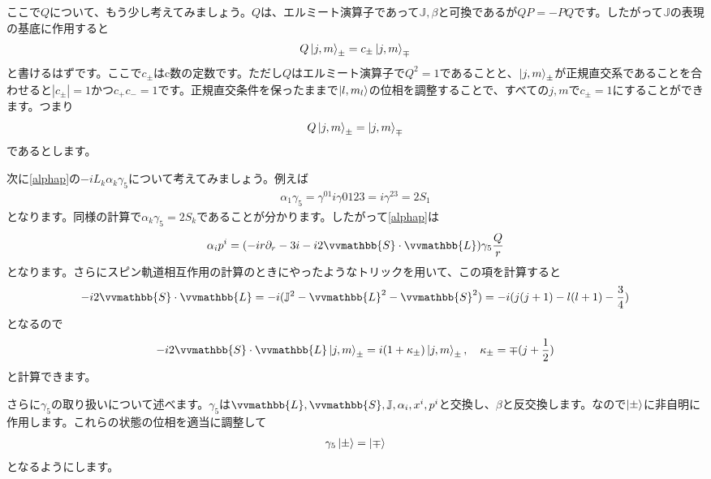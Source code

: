 \documentclass[report,paper=a4, fontsize=12pt, line_length=16cm, number_of_lines=33,dvipdfmx]{jlreq}
\numberwithin{equation}{chapter}
\newcommand{\del}{\partial}
\newcommand{\Lb}{\vvmathbb{L}}
\newcommand{\Sb}{\vvmathbb{S}}
\newcommand{\Jb}{\mathbb{J}}
\newcommand{\ml}{m_{l}}
\begin{document}
ここで$Q$について、もう少し考えてみましょう。$Q$は、エルミート演算子であって$\Jb,\beta$と可換であるが$QP=-PQ$です。したがって$\Jb$の表現の基底に作用すると
\begin{align*}
  Q\ket{j,m}_{\pm}=c_{\pm}\ket{j,m}_{\mp}
\end{align*}
と書けるはずです。ここで$c_{\pm}$はc数の定数です。ただし$Q$はエルミート演算子で$Q^2=1$であることと、$\ket{j,m}_{\pm}$が正規直交系であることを合わせると$|c_{\pm}|=1$かつ$c_{+}c_{-}=1$です。正規直交条件を保ったままで$\ket{l,\ml}$の位相を調整することで、すべての$j,m$で$c_{\pm}=1$にすることができます。つまり
\begin{align*}
  Q\ket{j,m}_{\pm}=\ket{j,m}_{\mp}
\end{align*}
であるとします。

次に\eqref{alphap}の$-iL_{k}\alpha_{k}\gamma_5$について考えてみましょう。例えば
\begin{align*}
  \alpha_1\gamma_5=\gamma^{01}i\gamma{0123}=i\gamma^{23}=2S_{1}
\end{align*}
となります。同様の計算で$\alpha_{k}\gamma_{5}=2S_{k}$であることが分かります。したがって\eqref{alphap}は
\begin{align}
  \alpha_ip^i=(-ir\del_{r}-3i-i2\Sb\cdot \Lb)\gamma_5\frac{Q}{r}
  \label{alphap2}
\end{align}
となります。さらにスピン軌道相互作用の計算のときにやったようなトリックを用いて、この項を計算すると
\begin{align*}
  -i2\Sb\cdot\Lb=-i(\Jb^2-\Lb^2-\Sb^2)=-i(j(j+1)-l(l+1)-\frac34)
\end{align*}
となるので
\begin{align*}
  -i2\Sb\cdot\Lb\ket{j,m}_{\pm}=i(1+\kappa_{\pm})\ket{j,m}_{\pm},\quad
  \kappa_{\pm}=\mp(j+\frac12)
\end{align*}
と計算できます。

さらに$\gamma_5$の取り扱いについて述べます。$\gamma_5$は$\Lb,\Sb,\Jb,\alpha_i,x^i,p^i$と交換し、$\beta$と反交換します。なので$\ket{\pm}$に非自明に作用します。これらの状態の位相を適当に調整して
\begin{align*}
  \gamma_5\ket{\pm}=\ket{\mp}
\end{align*}
となるようにします。
\end{document}

